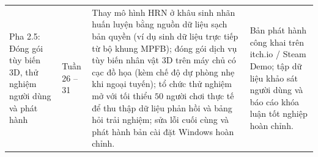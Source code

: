 {\begin{longtable}{|L{2.5cm}|L{2.0cm}|L{5.7cm}|L{4.7cm}|}
        \hline
        Pha 2.5: Đóng gói tùy biến 3D, thử nghiệm người dùng và phát hành & Tuần 26 -- 31 & Thay mô hình HRN ở khâu sinh nhãn huấn luyện bằng nguồn dữ liệu sạch bản quyền (ví dụ sinh dữ liệu trực tiếp từ bộ khung MPFB); đóng gói dịch vụ tùy biến nhân vật 3D trên máy chủ có cạc đồ họa (kèm chế độ dự phòng nhẹ khi ngoại tuyến); tổ chức thử nghiệm mở với tối thiểu $50$ người chơi thực tế để thu thập dữ liệu phản hồi và bảng hỏi trải nghiệm; sửa lỗi cuối cùng và phát hành bản cài đặt Windows hoàn chỉnh. & Bản phát hành công khai trên itch.io / Steam Demo; tập dữ liệu khảo sát người dùng và báo cáo khóa luận tốt nghiệp hoàn chỉnh. \\
\end{longtable}
}
